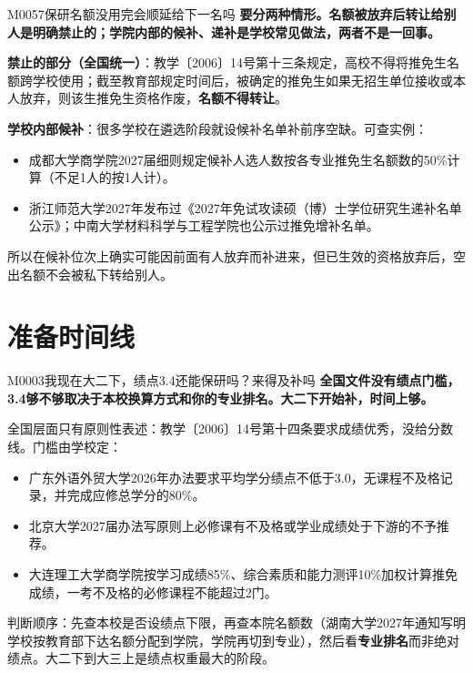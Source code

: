 \begin{qa}{M0057}{保研名额没用完会顺延给下一名吗}
\textbf{要分两种情形。名额被放弃后转让给别人是明确禁止的；学院内部的候补、递补是学校常见做法，两者不是一回事。}

\textbf{禁止的部分（全国统一）}：教学〔2006〕14号第十三条规定，高校不得将推免生名额跨学校使用；截至教育部规定时间后，被确定的推免生如果无招生单位接收或本人放弃，则该生推免生资格作废，\textbf{名额不得转让}。

\textbf{学校内部候补}：很多学校在遴选阶段就设候补名单补前序空缺。可查实例：

\begin{itemize}
  \item 成都大学商学院2027届细则规定候补人选人数按各专业推免生名额数的50\%计算（不足1人的按1人计）。
  \item 浙江师范大学2027年发布过《2027年免试攻读硕（博）士学位研究生递补名单公示》；中南大学材料科学与工程学院也公示过推免增补名单。
\end{itemize}

所以在候补位次上确实可能因前面有人放弃而补进来，但已生效的资格放弃后，空出名额不会被私下转给别人。
\end{qa}

\section{准备时间线}
\begin{qa}{M0003}{我现在大二下，绩点3.4还能保研吗？来得及补吗}
\textbf{全国文件没有绩点门槛，3.4够不够取决于本校换算方式和你的专业排名。大二下开始补，时间上够。}

全国层面只有原则性表述：教学〔2006〕14号第十四条要求成绩优秀，没给分数线。门槛由学校定：

\begin{itemize}
  \item 广东外语外贸大学2026年办法要求平均学分绩点不低于3.0，无课程不及格记录，并完成应修总学分的80\%。
  \item 北京大学2027届办法写原则上必修课有不及格或学业成绩处于下游的不予推荐。
  \item 大连理工大学商学院按学习成绩85\%、综合素质和能力测评10\%加权计算推免成绩，一考不及格的必修课程不能超过2门。
\end{itemize}

判断顺序：先查本校是否设绩点下限，再查本院名额数（湖南大学2027年通知写明学校按教育部下达名额分配到学院，学院再切到专业），然后看\textbf{专业排名}而非绝对绩点。大二下到大三上是绩点权重最大的阶段。
\end{qa}

